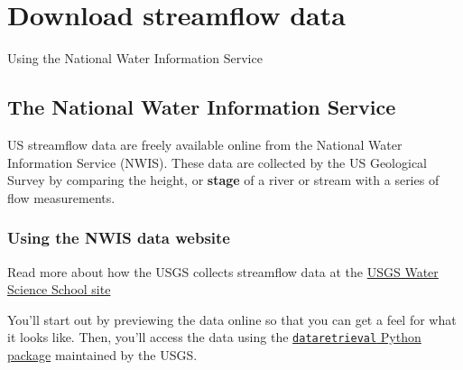 \documentclass[
  letterpaper,
  DIV=11,
  numbers=noendperiod,
  oneside]{scrreprt}
\begin{document}

\chapter{Download streamflow data}\label{download-streamflow-data}

Using the National Water Information Service

\hfill\break

\section{The National Water Information
Service}\label{the-national-water-information-service}

US streamflow data are freely available online from the National Water
Information Service (NWIS). These data are collected by the US
Geological Survey by comparing the height, or \textbf{stage} of a river
or stream with a series of flow measurements.

\subsection{Using the NWIS data
website}\label{using-the-nwis-data-website}

\begin{tcolorbox}[enhanced jigsaw, colbacktitle=quarto-callout-color!10!white, opacityback=0, bottomtitle=1mm, toptitle=1mm, bottomrule=.15mm, left=2mm, colframe=quarto-callout-color-frame, leftrule=.75mm, opacitybacktitle=0.6, colback=white, rightrule=.15mm, toprule=.15mm, breakable, titlerule=0mm, title=\textcolor{quarto-callout-color}{\faInfo}\hspace{0.5em}{Read More}, coltitle=black, arc=.35mm]

Read more about how the USGS collects streamflow data at the
\href{https://www.usgs.gov/index.php/special-topics/water-science-school/science/how-does-usgs-collect-streamflow-data}{USGS
Water Science School site}

\end{tcolorbox}

You'll start out by previewing the data online so that you can get a
feel for what it looks like. Then, you'll access the data using the
\href{https://doi-usgs.github.io/dataretrieval-python/}{\texttt{dataretrieval}
Python package} maintained by the USGS.
\end{document}
